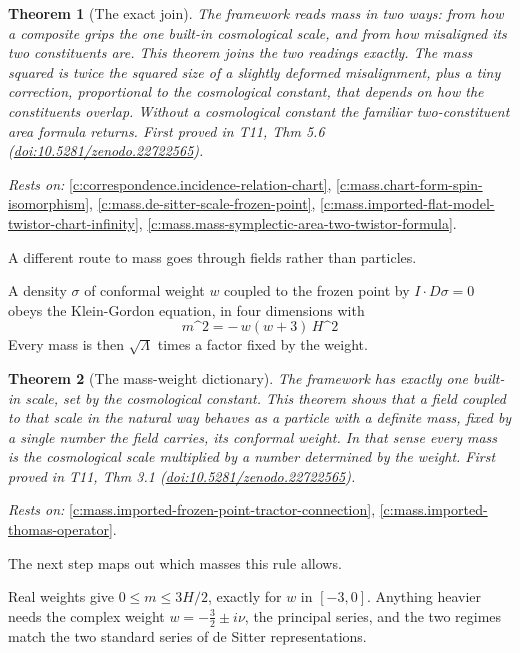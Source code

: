 \documentclass[11pt]{article}
\newtheorem{theorem}{Theorem}[section]
\theoremstyle{definition}
\theoremstyle{plain}
\begin{document}
\begin{theorem}[The exact join]\label{c:mass.exact-join}
The framework reads mass in two ways: from how a composite grips the one built-in cosmological scale, and from how misaligned its two constituents are. This theorem joins the two readings exactly. The mass squared is twice the squared size of a slightly deformed misalignment, plus a tiny correction, proportional to the cosmological constant, that depends on how the constituents overlap. Without a cosmological constant the familiar two-constituent area formula returns.
\emph{First proved in} T11, Thm 5.6 (\href{https://doi.org/10.5281/zenodo.22722565}{doi:10.5281/zenodo.22722565}).
\end{theorem}
\noindent\emph{Rests on:} \ref{c:correspondence.incidence-relation-chart}, \ref{c:mass.chart-form-spin-isomorphism}, \ref{c:mass.de-sitter-scale-frozen-point}, \ref{c:mass.imported-flat-model-twistor-chart-infinity}, \ref{c:mass.mass-symplectic-area-two-twistor-formula}.

A different route to mass goes through fields rather than particles.

A density $\sigma$ of conformal weight $w$ coupled to the frozen point by $I \cdot D\sigma = 0$ obeys the Klein-Gordon equation, in four dimensions with \[ m\^{}{2} = -\,w(w+3)\,H\^{}{2} \] Every mass is then $\sqrt{\Lambda}$ times a factor fixed by the weight.

\begin{theorem}[The mass-weight dictionary]\label{c:mass.mass-weight-dictionary}
The framework has exactly one built-in scale, set by the cosmological constant. This theorem shows that a field coupled to that scale in the natural way behaves as a particle with a definite mass, fixed by a single number the field carries, its conformal weight. In that sense every mass is the cosmological scale multiplied by a number determined by the weight.
\emph{First proved in} T11, Thm 3.1 (\href{https://doi.org/10.5281/zenodo.22722565}{doi:10.5281/zenodo.22722565}).
\end{theorem}
\noindent\emph{Rests on:} \ref{c:mass.imported-frozen-point-tractor-connection}, \ref{c:mass.imported-thomas-operator}.

The next step maps out which masses this rule allows.

Real weights give $0 \le m \le 3H/2$, exactly for $w$ in $[-3, 0]$. Anything heavier needs the complex weight $w = -\tfrac32 \pm i\nu$, the principal series, and the two regimes match the two standard series of de Sitter representations.
\end{document}
